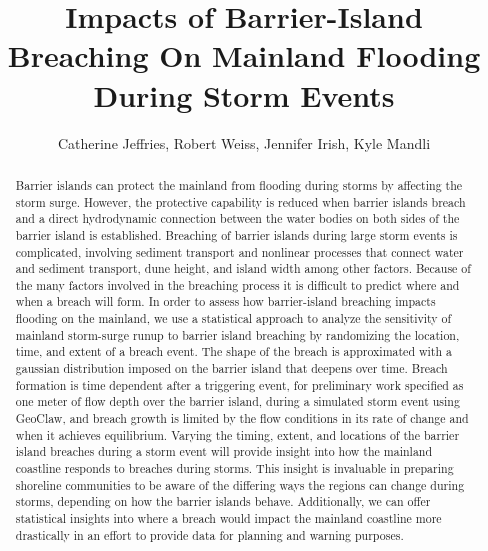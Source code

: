 \documentclass{coastal_paper}
\title{Impacts of Barrier-Island Breaching On Mainland Flooding During Storm Events}
\author{Catherine Jeffries, Robert Weiss, Jennifer Irish, Kyle Mandli}
\begin{document}
\maketitle
\begin{abstract}
Barrier islands can protect the mainland from flooding during storms by affecting the storm surge. However, the protective capability is reduced when barrier islands breach and a direct hydrodynamic connection between the water bodies on both sides of the barrier island is established. Breaching of barrier islands during large storm events is complicated, involving sediment transport and nonlinear processes that connect water and sediment transport, dune height, and island width among other factors. Because of the many factors involved in the breaching process it is difficult to predict where and when a breach will form. In order to assess how barrier-island breaching impacts flooding on the mainland, we use a statistical approach to analyze the sensitivity of mainland storm-surge runup to barrier island breaching by randomizing the location, time, and extent of a breach event. The shape of the breach is approximated with a gaussian distribution imposed on the barrier island that deepens over time. Breach formation is time dependent after a triggering event, for preliminary work specified as one meter of flow depth over the barrier island, during a simulated storm event using GeoClaw, and breach growth is limited by the flow conditions in its rate of change and when it achieves equilibrium. Varying the timing, extent, and locations of the barrier island breaches during a storm event will provide insight into how the mainland coastline responds to breaches during storms. This insight is invaluable in preparing shoreline communities to be aware of the differing ways the regions can change during storms, depending on how the barrier islands behave. Additionally, we can offer statistical insights into where a breach would impact the mainland coastline more drastically in an effort to provide data for planning and warning purposes.    
\end{abstract}
\newpage

\linenumbers
\end{document}

